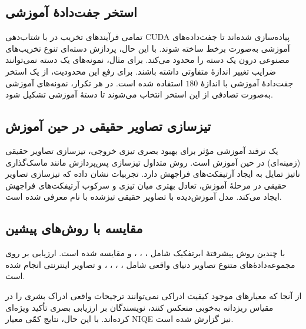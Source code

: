 \subsection{استخر جفت‌دادهٔ آموزشی}
تمامی فرآیندهای تخریب در  با شتاب‌دهی CUDA پیاده‌سازی شده‌اند تا جفت‌داده‌های آموزشی به‌صورت برخط ساخته شوند. با این حال، پردازش دسته‌ای تنوع تخریب‌های مصنوعی درون یک دسته را محدود می‌کند. برای مثال، نمونه‌های یک دسته نمی‌توانند ضرایب تغییر اندازهٔ متفاوتی داشته باشند. برای رفع این محدودیت، از یک استخر جفت‌دادهٔ آموزشی با اندازهٔ $180$ استفاده شده است. در هر تکرار، نمونه‌های آموزشی به‌صورت تصادفی از این استخر انتخاب می‌شوند تا دستهٔ آموزشی تشکیل شود.

\subsection{تیزسازی تصاویر حقیقی در حین آموزش}
یک ترفند آموزشی مؤثر برای بهبود بصری تیزی خروجی، تیزسازی تصاویر حقیقی (زمینه‌ای) در حین آموزش است. روش متداول تیزسازی پس‌پردازش مانند ماسک‌گذاری ناتیز تمایل به ایجاد آرتیفکت‌های فراجهش دارد. تجربیات نشان داده که تیزسازی تصاویر حقیقی در مرحلهٔ آموزش، تعادل بهتری میان تیزی و سرکوب آرتیفکت‌های فراجهش ایجاد می‌کند. مدل آموزش‌دیده با تصاویر حقیقی تیزشده با نام  معرفی شده است.


\subsection{مقایسه با روش‌های پیشین}
\label{subsec:comparisons}

 با چندین روش پیشرفتهٔ ابرتفکیک شامل  \cite{wang2018esrganenhancedsuperresolutiongenerative}،  \cite{luo2020dan}،  \cite{wei2020cdc}،  \cite{ji2020realsr} و  \cite{zhang2021bsrgan} مقایسه شده است. ارزیابی بر روی مجموعه‌دادهٔ‌های متنوع تصاویر دنیای واقعی شامل ، ، ، ،  و تصاویر اینترنتی انجام شده است.

از آنجا که معیارهای موجود کیفیت ادراکی نمی‌توانند ترجیحات واقعی ادراک بشری را در مقیاس ریزدانه به‌خوبی منعکس کنند، نویسندگان بر ارزیابی بصری تأکید ویژه‌ای کرده‌اند. با این حال، نتایج کمّی معیار NIQE \cite{mittal2013niqe} نیز گزارش شده است.

